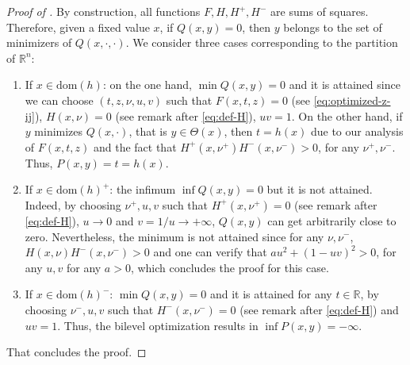 \documentclass{article}
\newcommand*{\cS}{\mathcal{S}}
\newcommand*{\RR}{\mathbb{R}}
\newcommand{\graph}{\mathrm{graph}\ }
\newcommand{\firstvar}{x}
\newcommand{\secondvar}{y}
\newcommand{\dom}{\mathrm{dom}}
\newcommand{\valoptim}{\varphi_o}
\newcommand{\valpessim}{\varphi_p}
\theoremstyle{plain}
\theoremstyle{definition}
\begin{document}
\begin{proof}[Proof of ]
    By construction, all functions $F, H, H^+, H^-$ are sums of squares. Therefore, given a fixed value $\firstvar$, if $Q(\firstvar, \secondvar) = 0$, then $\secondvar$ belongs to the set of minimizers of $Q(x, \cdot,\cdot)$. We consider three cases corresponding to the partition of $\RR^n$:
    \begin{enumerate}
        \item If $\firstvar \in \dom(h)$: on the one hand, $\min Q(\firstvar, \secondvar) = 0$ and it is attained since we can choose $(t,z, \nu, u, v)$ such that $F(\firstvar, t,z) = 0$ (see \cref{eq:optimized-z-ij}), $H(\firstvar,\nu) = 0$ (see remark after \cref{eq:def-H}), $uv = 1$. On the other hand, if $\secondvar$ minimizes $Q(\firstvar,\cdot)$, that is $\secondvar \in \Theta(\firstvar)$, then $t = h(\firstvar)$ due to our analysis of $F(\firstvar, t, z)$ and the fact that $H^+(\firstvar, \nu^+)H^-(\firstvar, \nu^-) > 0$, for any $\nu^+,\nu^-$. Thus, $P(\firstvar, \secondvar) = t = h(\firstvar)$. 
        \item If $\firstvar \in \dom(h)^+$: the infimum $\inf Q(\firstvar, \secondvar) = 0$ but it is not attained. Indeed, by choosing $\nu^+, u, v$ such that $H^+(\firstvar, \nu^+) = 0$ (see remark after \cref{eq:def-H}), $u \to 0$ and $v = 1/u \to +\infty$, $Q(\firstvar, \secondvar)$ can get arbitrarily close to zero. Nevertheless, the minimum is not attained since for any $\nu, \nu^-$, $H(\firstvar, \nu)H^-(\firstvar, \nu^-) > 0$ and one can verify that $au^2 + (1 - uv)^2 > 0$, for any $u,v$ for any $a > 0$, which concludes the proof for this case.
        \item If $\firstvar \in \dom(h)^-$: $\min Q(\firstvar, \secondvar) = 0$ and it is attained for any $t \in \RR$, by choosing $\nu^-, u, v$ such that $H^-(\firstvar,\nu^-) = 0$ (see remark after \cref{eq:def-H}) and $uv = 1$. Thus, the bilevel optimization results in $\inf P(\firstvar, \secondvar) = -\infty$. 
    \end{enumerate}
    That concludes the proof.
\end{proof}
    
\end{document}

